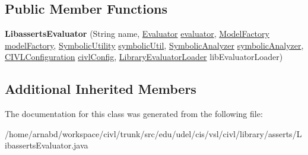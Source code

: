 \subsection*{Public Member Functions}
\begin{DoxyCompactItemize}
\item 
\hypertarget{classedu_1_1udel_1_1cis_1_1vsl_1_1civl_1_1library_1_1asserts_1_1LibassertsEvaluator_a4767100974af7dfb581e5b60c59cecd5}{}{\bfseries Libasserts\+Evaluator} (String name, \hyperlink{interfaceedu_1_1udel_1_1cis_1_1vsl_1_1civl_1_1semantics_1_1IF_1_1Evaluator}{Evaluator} \hyperlink{classedu_1_1udel_1_1cis_1_1vsl_1_1civl_1_1library_1_1common_1_1BaseLibraryEvaluator_a972ee04104e6fe26bb927ceddb93462d}{evaluator}, \hyperlink{interfaceedu_1_1udel_1_1cis_1_1vsl_1_1civl_1_1model_1_1IF_1_1ModelFactory}{Model\+Factory} \hyperlink{classedu_1_1udel_1_1cis_1_1vsl_1_1civl_1_1library_1_1common_1_1LibraryComponent_ac38a7c7971f70f8c969e55538a17f016}{model\+Factory}, \hyperlink{interfaceedu_1_1udel_1_1cis_1_1vsl_1_1civl_1_1dynamic_1_1IF_1_1SymbolicUtility}{Symbolic\+Utility} \hyperlink{classedu_1_1udel_1_1cis_1_1vsl_1_1civl_1_1library_1_1common_1_1LibraryComponent_a18214426269e7c352f4926264837c8a6}{symbolic\+Util}, \hyperlink{interfaceedu_1_1udel_1_1cis_1_1vsl_1_1civl_1_1semantics_1_1IF_1_1SymbolicAnalyzer}{Symbolic\+Analyzer} \hyperlink{classedu_1_1udel_1_1cis_1_1vsl_1_1civl_1_1library_1_1common_1_1LibraryComponent_a7a1213c02b2d29a79f550c7090594967}{symbolic\+Analyzer}, \hyperlink{classedu_1_1udel_1_1cis_1_1vsl_1_1civl_1_1config_1_1IF_1_1CIVLConfiguration}{C\+I\+V\+L\+Configuration} \hyperlink{classedu_1_1udel_1_1cis_1_1vsl_1_1civl_1_1library_1_1common_1_1LibraryComponent_a223e603cab7a909db88f49c256b2ce98}{civl\+Config}, \hyperlink{interfaceedu_1_1udel_1_1cis_1_1vsl_1_1civl_1_1semantics_1_1IF_1_1LibraryEvaluatorLoader}{Library\+Evaluator\+Loader} lib\+Evaluator\+Loader)\label{classedu_1_1udel_1_1cis_1_1vsl_1_1civl_1_1library_1_1asserts_1_1LibassertsEvaluator_a4767100974af7dfb581e5b60c59cecd5}

\end{DoxyCompactItemize}
\subsection*{Additional Inherited Members}


The documentation for this class was generated from the following file\+:\begin{DoxyCompactItemize}
\item 
/home/arnabd/workspace/civl/trunk/src/edu/udel/cis/vsl/civl/library/asserts/Libasserts\+Evaluator.\+java\end{DoxyCompactItemize}
